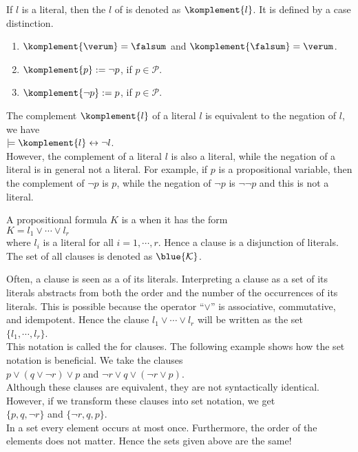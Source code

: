 If  $l$ is a literal, then the  $l$ of is denoted as $\komplement{l}$.
It is defined by a case distinction.
\begin{enumerate}
\item $\komplement{\verum} = \falsum$ \quad and \quad $\komplement{\falsum} = \verum$. 
\item $\komplement{p} := \neg p$, \quad if $p \in \mathcal{P}$.
\item $\komplement{\neg p} := p$, \quad if $p \in \mathcal{P}$.
\end{enumerate}
The complement $\komplement{l}$ of a literal $l$ is equivalent to the negation of $l$, we have
\\[0.2cm]
\hspace*{1.3cm}
$\models \komplement{l} \leftrightarrow \neg l$.
\\[0.2cm]
However, the complement of a literal $l$ is also a literal, while the negation of a literal is in general not a
literal. For example, if $p$ is a propositional variable, then the complement of $\neg p$ is $p$, while the
negation of $\neg p$ is $\neg \neg p$ and this is not a literal.

\begin{Definition}[Clause]
  A propositional formula $K$ is a  when it has the form \\[0.2cm]
  \hspace*{1.3cm} $K = l_1 \vee \cdots \vee l_r$ \\[0.2cm]
  where $l_i$ is a literal for all $i=1,\cdots,r$.  Hence a clause is a disjunction of literals.
  The set of all clauses is denoted as  $\blue{\mathcal{K}}$.
  \eox
\end{Definition}

Often, a clause is seen as a  of its literals.  Interpreting a clause as a set of its literals
abstracts from both the order and the number of the occurrences of its literals.
This is possible because the operator ``$\vee$'' is associative, commutative, and idempotent.  
Hence the clause  $l_1 \vee \cdots \vee l_r$ will be written as the set
\\[0.2cm]
\hspace*{1.3cm} $\{ l_1, \cdots, l_r \}$.
\\[0.2cm]
This notation is called the  for clauses.  
The following example shows how the set notation is beneficial.  We take the clauses
\\[0.2cm]
\hspace*{1.3cm}
$p \vee (q \vee \neg r) \vee p$ \quad and \quad $\neg r \vee q \vee (\neg r \vee p)$. 
\\[0.2cm]
Although these clauses are equivalent, they are not syntactically identical.  However, if we transform these
clauses into set notation, we get
\\[0.2cm]
\hspace*{1.3cm}
$\{p, q, \neg r \}$ \quad and \quad $\{ \neg r, q, p \}$. 
\\[0.2cm]
In a set every element occurs at most once.  Furthermore, the order of the elements does not matter.
Hence the sets given above are the same!


